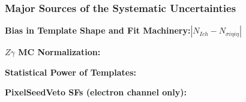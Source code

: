 \begin{frame}\frametitle{Major Sources of the Systematic Uncertainties}

\footnotesize{\bfseries{Bias in Template Shape and Fit Machinery:}}\scriptsize{$|N_{Ich}-N_{\sigma{i\eta i\eta}}|$}

\footnotesize{\bfseries{$Z\gamma$ MC Normalization:}}\scriptsize{}

\footnotesize{\bfseries{Statistical Power of Templates:}}\scriptsize{}

\footnotesize{\bfseries{PixelSeedVeto SFs (electron channel only):}}\scriptsize{}

\end{frame}%
